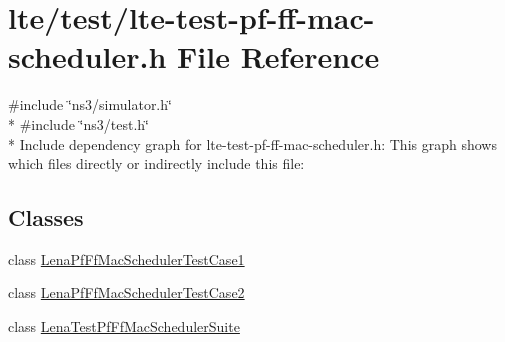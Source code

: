 \hypertarget{lte-test-pf-ff-mac-scheduler_8h}{}\section{lte/test/lte-\/test-\/pf-\/ff-\/mac-\/scheduler.h File Reference}
\label{lte-test-pf-ff-mac-scheduler_8h}
{\ttfamily \#include \char`\"{}ns3/simulator.\+h\char`\"{}}\\*
{\ttfamily \#include \char`\"{}ns3/test.\+h\char`\"{}}\\*
Include dependency graph for lte-\/test-\/pf-\/ff-\/mac-\/scheduler.h\+:
This graph shows which files directly or indirectly include this file\+:
\subsection*{Classes}
\begin{DoxyCompactItemize}
\item 
class \hyperlink{classLenaPfFfMacSchedulerTestCase1}{Lena\+Pf\+Ff\+Mac\+Scheduler\+Test\+Case1}
\item 
class \hyperlink{classLenaPfFfMacSchedulerTestCase2}{Lena\+Pf\+Ff\+Mac\+Scheduler\+Test\+Case2}
\item 
class \hyperlink{classLenaTestPfFfMacSchedulerSuite}{Lena\+Test\+Pf\+Ff\+Mac\+Scheduler\+Suite}
\end{DoxyCompactItemize}
